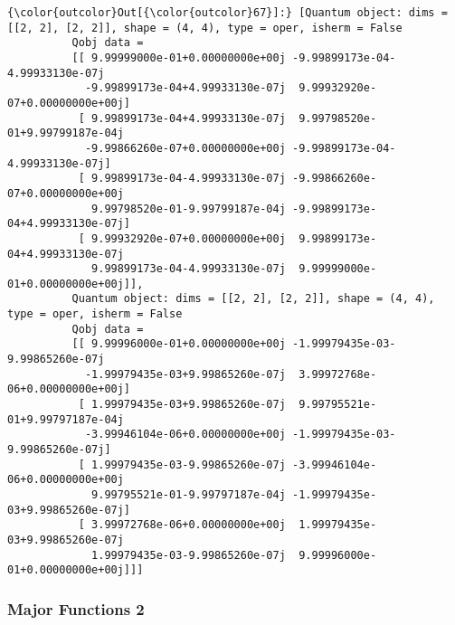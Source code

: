\documentclass[11pt]{article}
\begin{document}
\begin{Verbatim}[commandchars=\\\{\}]
{\color{outcolor}Out[{\color{outcolor}67}]:} [Quantum object: dims = [[2, 2], [2, 2]], shape = (4, 4), type = oper, isherm = False
          Qobj data =
          [[ 9.99999000e-01+0.00000000e+00j -9.99899173e-04-4.99933130e-07j
            -9.99899173e-04+4.99933130e-07j  9.99932920e-07+0.00000000e+00j]
           [ 9.99899173e-04+4.99933130e-07j  9.99798520e-01+9.99799187e-04j
            -9.99866260e-07+0.00000000e+00j -9.99899173e-04-4.99933130e-07j]
           [ 9.99899173e-04-4.99933130e-07j -9.99866260e-07+0.00000000e+00j
             9.99798520e-01-9.99799187e-04j -9.99899173e-04+4.99933130e-07j]
           [ 9.99932920e-07+0.00000000e+00j  9.99899173e-04+4.99933130e-07j
             9.99899173e-04-4.99933130e-07j  9.99999000e-01+0.00000000e+00j]],
          Quantum object: dims = [[2, 2], [2, 2]], shape = (4, 4), type = oper, isherm = False
          Qobj data =
          [[ 9.99996000e-01+0.00000000e+00j -1.99979435e-03-9.99865260e-07j
            -1.99979435e-03+9.99865260e-07j  3.99972768e-06+0.00000000e+00j]
           [ 1.99979435e-03+9.99865260e-07j  9.99795521e-01+9.99797187e-04j
            -3.99946104e-06+0.00000000e+00j -1.99979435e-03-9.99865260e-07j]
           [ 1.99979435e-03-9.99865260e-07j -3.99946104e-06+0.00000000e+00j
             9.99795521e-01-9.99797187e-04j -1.99979435e-03+9.99865260e-07j]
           [ 3.99972768e-06+0.00000000e+00j  1.99979435e-03+9.99865260e-07j
             1.99979435e-03-9.99865260e-07j  9.99996000e-01+0.00000000e+00j]]]
\end{Verbatim}
            
    \subsubsection{Major Functions 2}\label{major-functions-2}
\end{document}
